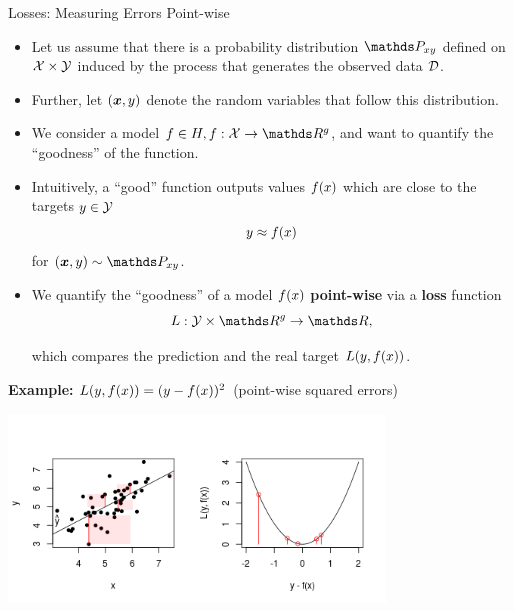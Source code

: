 \begin{vbframe}{Losses: Measuring Errors Point-wise}

\begin{itemize}
  \item Let us assume that there is a probability distribution $\Pxy$ defined on $\mathcal{X} \times \mathcal{Y}$ induced by the process that generates the observed data $\mathcal{D}$. 
  \item Further, let $(\bm{x}, y)$ denote the random variables that follow this distribution. 
  \item We consider a model $f \in \Hspace, f: \Xspace \to \R^g$, and want to quantify the \enquote{goodness} of the function. 
  \item Intuitively, a \enquote{good} function outputs values $f(x)$ which are close to the targets $y \in \mathcal{Y}$
  $$
    y \approx f(x) 
  $$
  for $(\xv, y) \sim \Pxy$. 
  \item We quantify the \enquote{goodness} of a model $f(x)$ \textbf{point-wise} via a \textbf{loss} function 
    $$
    L: \Yspace \times \R^g \to \R,
    $$

  which compares the prediction and the real target $L(y, f(x))$.
\end{itemize}

\textbf{Example:} $L(y, f(x)) = (y - f(x))^2$ (point-wise squared errors)

\vspace*{-4mm}

\begin{center}
  \includegraphics[width = 10cm]{figure_man/loss_quadratic_plot1.png} \\
\end{center}

\end{vbframe}



